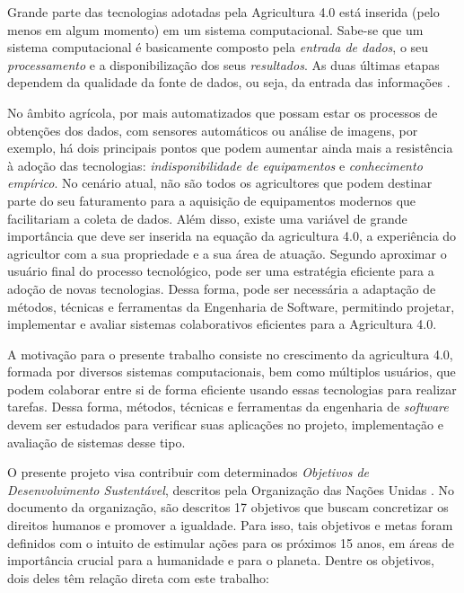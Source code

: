\documentclass[12pt]{article}
\begin{document}
Grande parte das tecnologias adotadas pela Agricultura 4.0 está inserida (pelo menos em algum momento) em um sistema computacional. Sabe-se que um sistema computacional é basicamente composto pela \textit{entrada de dados}, o seu \textit{processamento} e a disponibilização dos seus \textit{resultados}. As duas últimas etapas dependem da qualidade da fonte de dados, ou seja, da entrada das informações \cite{Torres:2013}.

No âmbito agrícola, por mais automatizados que possam estar os processos de obtenções dos dados, com sensores automáticos ou análise de imagens, por exemplo, há dois principais pontos que podem aumentar ainda mais a resistência à adoção das tecnologias: \textit{indisponibilidade de equipamentos} e \textit{conhecimento empírico}. No cenário atual, não são todos os agricultores que podem destinar parte do seu faturamento para a aquisição de equipamentos modernos que facilitariam a coleta de dados. Além disso, existe uma variável de grande importância que deve ser inserida na equação da agricultura 4.0, a experiência do agricultor com a sua propriedade e a sua área de atuação. Segundo  aproximar o usuário final do processo tecnológico, pode ser uma estratégia eficiente para a adoção de novas tecnologias. Dessa forma, pode ser necessária a adaptação de métodos, técnicas e ferramentas da Engenharia de Software, permitindo projetar, implementar e avaliar sistemas colaborativos eficientes para a Agricultura 4.0.

A motivação para o presente trabalho consiste no crescimento da agricultura 4.0, formada por diversos sistemas computacionais, bem como múltiplos usuários, que podem colaborar entre si de forma eficiente usando essas tecnologias para realizar tarefas. Dessa forma, métodos, técnicas e ferramentas da engenharia de \textit{software} devem ser estudados para verificar suas aplicações no projeto, implementação e avaliação de sistemas desse tipo.

O presente projeto visa contribuir com determinados \textit{Objetivos de Desenvolvimento Sustentável}, descritos pela Organização das Nações Unidas \cite{ONU:2020}. No documento da organização, são descritos 17 objetivos que buscam concretizar os direitos humanos e promover a igualdade. Para isso, tais objetivos e metas foram definidos com o intuito de estimular ações para os próximos 15 anos, em áreas de importância crucial para a humanidade e para o planeta. Dentre os objetivos, dois deles têm relação direta com este trabalho:
\end{document}
